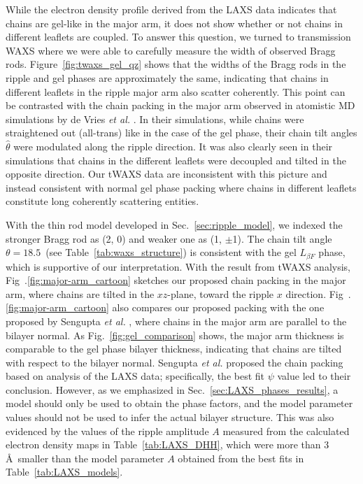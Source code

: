 While the electron density profile derived from the LAXS data indicates that 
chains are gel-like in the major arm, it does not show whether or not chains 
in different leaflets are coupled. To answer this question, we turned to
transmission WAXS where we were able to carefully measure the width of 
observed Bragg rods. Figure~\ref{fig:twaxs_gel_qz} shows that the widths of the Bragg
rods in the ripple and gel phases are approximately the same, indicating that
chains in different leaflets in the ripple major arm also scatter coherently.
This point can be contrasted with the chain packing in the major arm
observed in atomistic MD simulations by de Vries \textit{et al.} \cite{ref:deVries05}.
In their simulations, while chains were straightened out (all-trans) like in 
the case of the gel phase, their chain tilt angles $\hat{\theta}$ were modulated 
along the ripple direction. It was also
clearly seen in their simulations that chains in the different leaflets were 
decoupled and tilted in the opposite direction. Our tWAXS data are 
inconsistent with this picture and instead consistent with normal
gel phase packing where chains in different leaflets constitute long coherently
scattering entities.

With the thin rod model developed in Sec.~\ref{sec:ripple_model}, we indexed 
the stronger Bragg rod as (2, 0) and weaker one as (1, $\pm$1). 
The chain tilt angle $\theta=18.5$\textdegree\
(see Table~\ref{tab:waxs_structure}) is consistent with the gel 
$L_{\beta F}$ phase, which is supportive of our interpretation.
With the result from tWAXS analysis, Fig~.\ref{fig:major-arm_cartoon} sketches
our proposed chain packing in the major arm, where
chains are tilted in the $xz$-plane, toward the ripple $x$ direction.
Fig~.\ref{fig:major-arm_cartoon} also compares our proposed packing with
the one proposed by Sengupta \textit{et al.} \cite{ref:Sengupta03},
where chains in the major arm are parallel to the bilayer normal.
As Fig.~\ref{fig:gel_comparison} shows, the major arm thickness is 
comparable to the gel phase bilayer thickness, indicating that chains are
tilted with respect to the bilayer normal.
Sengupta \textit{et al.} proposed the chain packing based on analysis of the 
LAXS data; specifically, the best fit $\psi$ value led to their conclusion. 
However, as we emphasized in Sec.~\ref{sec:LAXS_phases_results},
a model should only be used to obtain the phase factors, and the model parameter
values should not be used to infer the actual bilayer structure.
This was also evidenced by the values of the ripple amplitude $A$ measured 
from the calculated
electron density maps in Table~\ref{tab:LAXS_DHH}, which were more than
3 \AA\ smaller than the model parameter $A$ obtained from the best fits
in Table~\ref{tab:LAXS_models}.

